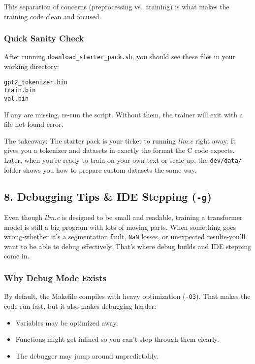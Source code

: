\documentclass[
  letterpaper,
  DIV=11,
  numbers=noendperiod]{scrreprt}
\providecommand{\tightlist}{%
  \setlength{\itemsep}{0pt}\setlength{\parskip}{0pt}}
\begin{document}
This separation of concerns (preprocessing vs.~training) is what makes
the training code clean and focused.

\subsubsection{Quick Sanity Check}\label{quick-sanity-check}

After running \texttt{download\_starter\_pack.sh}, you should see these
files in your working directory:

\begin{verbatim}
gpt2_tokenizer.bin
train.bin
val.bin
\end{verbatim}

If any are missing, re-run the script. Without them, the trainer will
exit with a file-not-found error.

The takeaway: The starter pack is your ticket to running \emph{llm.c}
right away. It gives you a tokenizer and datasets in exactly the format
the C code expects. Later, when you're ready to train on your own text
or scale up, the \texttt{dev/data/} folder shows you how to prepare
custom datasets the same way.

\subsection{\texorpdfstring{8. Debugging Tips \& IDE Stepping
(\texttt{-g})}{8. Debugging Tips \& IDE Stepping (-g)}}\label{debugging-tips-ide-stepping--g}

Even though \emph{llm.c} is designed to be small and readable, training
a transformer model is still a big program with lots of moving parts.
When something goes wrong-whether it's a segmentation fault,
\texttt{NaN} losses, or unexpected results-you'll want to be able to
debug effectively. That's where debug builds and IDE stepping come in.

\subsubsection{Why Debug Mode Exists}\label{why-debug-mode-exists}

By default, the Makefile compiles with heavy optimization
(\texttt{-O3}). That makes the code run fast, but it also makes
debugging harder:

\begin{itemize}
\tightlist
\item
  Variables may be optimized away.
\item
  Functions might get inlined so you can't step through them clearly.
\item
  The debugger may jump around unpredictably.
\end{itemize}
\end{document}
